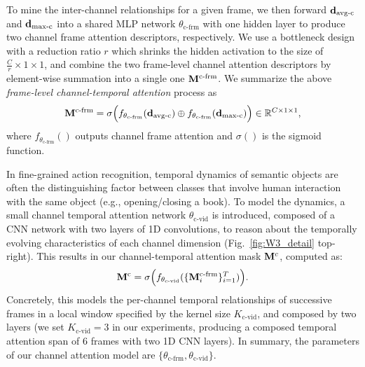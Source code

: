 \documentclass[runningheads]{llncs}
\begin{document}
To mine the inter-channel relationships for a given frame,
we then forward ${\bf d}_{\text{avg-c}}$
and ${\bf d}_{\text{max-c}}$ into a shared MLP network $\theta_{\text{c-frm}}$ with one hidden layer
to produce two channel frame attention descriptors, respectively.
We use a bottleneck design with a reduction ratio $r$
which shrinks the hidden activation to the size of $\frac{C}{r}\times 1 \times 1$,
and combine the two frame-level channel attention descriptors by element-wise summation
into a single one ${\bf M}^{\text{c-frm}}$.
We summarize the above {\em frame-level channel-temporal attention} process as
\begin{equation}
    {\bf M}^{\text{c-frm}} = 
    \sigma\Big(f_{\theta_{\text{c-frm}}}({\bf d}_{\text{avg-c}}) \oplus f_{\theta_{\text{c-frm}}}({\bf d}_{\text{max-c}})\Big)
    \in \mathbb{R}^{C\times 1 \times 1},
\end{equation}
where $f_{\theta_{\text{c-frm}}}()$ outputs channel frame attention
and $\sigma()$ is the sigmoid function.

In fine-grained action recognition, temporal dynamics of semantic objects are often the distinguishing factor between classes that involve human interaction with the same object (e.g., opening/closing a book). 
To model the dynamics, a small channel temporal attention network ${\theta_{\text{c-vid}}}$ is introduced, composed of 
a CNN network with two layers of 1D convolutions, to reason about the 
temporally evolving characteristics of each channel dimension (Fig.~\ref{fig:W3_detail} top-right).
This results in our channel-temporal attention mask ${\bf M}^c$, computed as:
\begin{equation}
    {\bf M}^{\text{c}} = 
    \sigma\Big(f_{\theta_{\text{c-vid}}}(\{{\bf M}^{\text{c-frm}}_i\}_{i=1}^T)\Big).
\end{equation}
Concretely, this models the per-channel temporal relationships of successive frames  in a local window specified 
by the kernel size $K_\text{c-vid}$, and composed by two layers (we set $K_\text{c-vid}=3$ in our experiments, producing a composed temporal attention span of 6 frames with two 1D CNN layers).
In summary, the parameters of our channel attention model are $\{\theta_{\text{c-frm}}, \theta_{\text{c-vid}}\}$.
\end{document}
